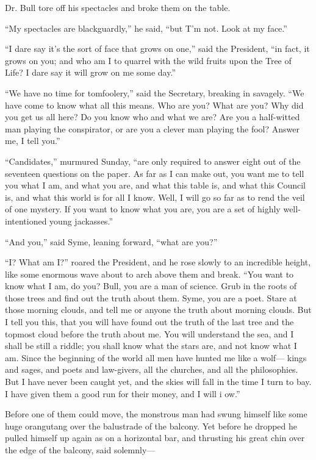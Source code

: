 \documentclass{book}
\begin{document}
Dr. Bull tore off his spectacles and broke them on the table.

“My spectacles are blackguardly,” he said, “but T’m not. Look at my face.”

“I dare say it’s the sort of face that grows on one,” said the President, “in fact, it grows on you; and who am I to quarrel with the wild fruits upon the Tree of Life? I dare say it will grow on me some day.”

“We have no time for tomfoolery,” said the Secretary, breaking in savagely. “We have come to know what all this means. Who are you? What are you? Why did you get us all here? Do you know who and what we are? Are you a half-witted man playing the conspirator, or are you a clever man playing the fool? Answer me, I tell you.”

“Candidates,” murmured Sunday, “are only required to answer eight out of the seventeen questions on the paper. As far as I can make out, you want me to tell you what I am, and what you are, and what this table is, and what this Council is, and what this world is for all I know. Well, I will go so far as to rend the veil of one mystery. If you want to know what you are, you are a set of highly well-intentioned young jackasses.”

“And you,” said Syme, leaning forward, “what are you?”

“I? What am I?” roared the President, and he rose slowly to an incredible height, like some enormous wave about to arch above them and break. “You want to know what I am, do you? Bull, you are a man of science. Grub in the roots of those trees and find out the truth about them. Syme, you are a poet. Stare at those morning clouds, and tell me or anyone the truth about morning clouds. But I tell you this, that you will have found out the truth of the last tree and the topmost cloud before the truth about me. You will understand the sea, and I shall be still a riddle; you shall know what the stars are, and not know what I am. Since the beginning of the world all men have hunted me like a wolf— kings and sages, and poets and law-givers, all the churches, and all the philosophies. But I have never been caught yet, and the skies will fall in the time I turn to bay. I have given them a good run for their money, and I will i ow.”

Before one of them could move, the monstrous man had swung himself like some huge orangutang over the balustrade of the balcony. Yet before he dropped he pulled himself up again as on a horizontal bar, and thrusting his great chin over the edge of the balcony, said solemnly—
\end{document}
